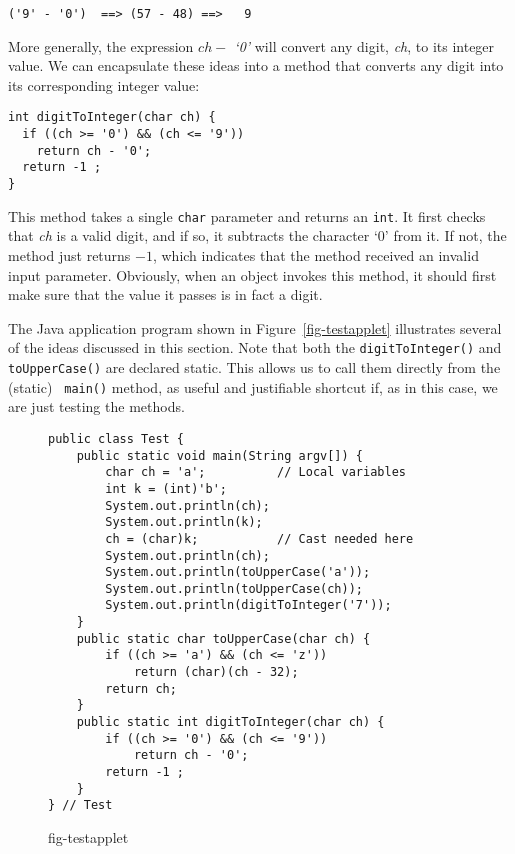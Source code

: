 \begin{jjjlisting}
\begin{lstlisting}
('9' - '0')  ==> (57 - 48) ==>   9
\end{lstlisting}
\end{jjjlisting}

\noindent More generally, the expression {\it $ch -$ `0'} will convert
any digit, {\it ch}, to its integer value. We can encapsulate these
ideas into a method that converts any digit into its corresponding
integer value:

\begin{jjjlisting}
\begin{lstlisting}
int digitToInteger(char ch) {
  if ((ch >= '0') && (ch <= '9'))
    return ch - '0';
  return -1 ;
}
\end{lstlisting}
\end{jjjlisting}

\noindent This method takes a single {\tt char} parameter and returns an
{\tt int}. It first checks that {\it ch} is a valid digit, and if
so, it subtracts the character `0' from it. If not, the method just
returns $-1$, which indicates that the method received an invalid input
parameter.  Obviously, when an object invokes this method, it should
first make sure that the value it passes is in fact a digit.

The Java application program shown in Figure~\ref{fig-testapplet}
illustrates several of the ideas discussed in this section. Note that
both the {\tt digitToInteger()} and {\tt toUpperCase()} are declared
static. This allows us to call them directly from the (static) {\tt
main()} method, as useful and justifiable shortcut if, as in this case,
we are just testing the methods. 

\begin{figure}[h]
\jjjprogstart
\begin{jjjlisting}
\begin{lstlisting}
public class Test {
    public static void main(String argv[]) {
        char ch = 'a';          // Local variables
        int k = (int)'b';
        System.out.println(ch);
        System.out.println(k);  
        ch = (char)k;           // Cast needed here
        System.out.println(ch);
        System.out.println(toUpperCase('a'));
        System.out.println(toUpperCase(ch));
        System.out.println(digitToInteger('7'));
    }
    public static char toUpperCase(char ch) {
        if ((ch >= 'a') && (ch <= 'z'))
            return (char)(ch - 32);
        return ch;
    }
    public static int digitToInteger(char ch) {
        if ((ch >= '0') && (ch <= '9'))
            return ch - '0';
        return -1 ;
    }
} // Test
\end{lstlisting}
\end{jjjlisting}
{fig-testapplet}
\end{figure}

